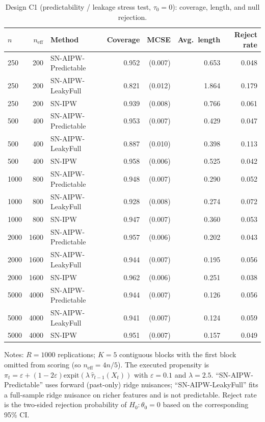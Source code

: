\documentclass[11pt]{article}
\numberwithin{equation}{section}
\newcommand{\mcse}[1]{{\footnotesize\,(#1)}}
\theoremstyle{plain}
\theoremstyle{definition}
\theoremstyle{remark}
\newcommand{\expit}{\mathrm{expit}}
\begin{document}
\begin{table}[!htbp]
\centering
\small
\begin{threeparttable}
\caption{Design C1 (predictability / leakage stress test, $\tau_0=0$): coverage, length, and null rejection.}
\label{tab:simC1}
\begin{tabular}{@{}l r l r r r r@{}}
\toprule
{$n$} & {$n_{\mathrm{eff}}$} & {Method} & {Coverage} & {MCSE} & {Avg.\ length} & {Reject rate} \\
\midrule
250 & 200 & SN-AIPW-Predictable & 0.952 & \mcse{0.007} & 0.653 & 0.048 \\
250 & 200 & SN-AIPW-LeakyFull & 0.821 & \mcse{0.012} & 1.864 & 0.179 \\
250 & 200 & SN-IPW & 0.939 & \mcse{0.008} & 0.766 & 0.061 \\
500 & 400 & SN-AIPW-Predictable & 0.953 & \mcse{0.007} & 0.429 & 0.047 \\
500 & 400 & SN-AIPW-LeakyFull & 0.887 & \mcse{0.010} & 0.398 & 0.113 \\
500 & 400 & SN-IPW & 0.958 & \mcse{0.006} & 0.525 & 0.042 \\
1000 & 800 & SN-AIPW-Predictable & 0.948 & \mcse{0.007} & 0.290 & 0.052 \\
1000 & 800 & SN-AIPW-LeakyFull & 0.928 & \mcse{0.008} & 0.274 & 0.072 \\
1000 & 800 & SN-IPW & 0.947 & \mcse{0.007} & 0.360 & 0.053 \\
2000 & 1600 & SN-AIPW-Predictable & 0.957 & \mcse{0.006} & 0.202 & 0.043 \\
2000 & 1600 & SN-AIPW-LeakyFull & 0.944 & \mcse{0.007} & 0.195 & 0.056 \\
2000 & 1600 & SN-IPW & 0.962 & \mcse{0.006} & 0.251 & 0.038 \\
5000 & 4000 & SN-AIPW-Predictable & 0.944 & \mcse{0.007} & 0.126 & 0.056 \\
5000 & 4000 & SN-AIPW-LeakyFull & 0.941 & \mcse{0.007} & 0.124 & 0.059 \\
5000 & 4000 & SN-IPW & 0.951 & \mcse{0.007} & 0.157 & 0.049 \\
\bottomrule
\end{tabular}
\begin{tablenotes}[flushleft]
\footnotesize
\item Notes: $R=1000$ replications; $K=5$ contiguous blocks with the first block omitted from scoring (so $n_{\mathrm{eff}}=4n/5$). The executed propensity is $\pi_t=\varepsilon+(1-2\varepsilon)\expit(\lambda\,\widehat\tau_{t-1}(X_t))$ with $\varepsilon=0.1$ and $\lambda=2.5$. ``SN-AIPW-Predictable'' uses forward (past-only) ridge nuisances; ``SN-AIPW-LeakyFull'' fits a full-sample ridge nuisance on richer features and is not predictable. Reject rate is the two-sided rejection probability of $H_0:\theta_0=0$ based on the corresponding 95\% CI.
\end{tablenotes}
\end{threeparttable}
\end{table}
\end{document}
